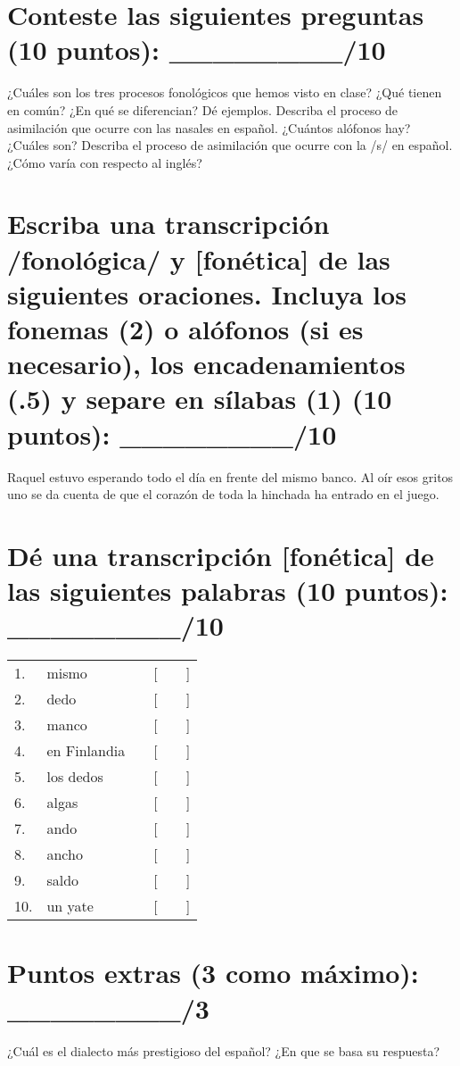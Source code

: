 \documentclass[12pt]{exam}
\begin{document}
\section{Conteste las siguientes preguntas (10 puntos): \_\_\_\_\_\_\_\_/10}
	\begin{questions}
		\question ¿Cuáles son los tres procesos fonológicos que hemos visto en clase? ¿Qué tienen en común? ¿En qué se diferencian? Dé ejemplos.
		\fillwithlines{2in}
		\question Describa el proceso de asimilación que ocurre con las nasales en español. ¿Cuántos alófonos hay? ¿Cuáles son?
		\fillwithlines{2in}
		\question Describa el proceso de asimilación que ocurre con la /s/ en español. ¿Cómo varía con respecto al inglés?
		\fillwithlines{2in}
	\end{questions}


\section{Escriba una transcripción /fonológica/ y [fonética] de las siguientes oraciones. Incluya los fonemas (2) o alófonos (si es necesario), los encadenamientos (.5) y separe en sílabas (1) (10 puntos): \_\_\_\_\_\_\_\_/10 }

	\begin{questions}
		\question Raquel estuvo esperando todo el día en frente del mismo banco. 
		\fillwithlines{.5in}
		\question Al oír esos gritos uno se da cuenta de que el corazón de toda la hinchada ha entrado en el juego. 
		\fillwithlines{.5in}
	\end{questions}

\section{Dé una transcripción [fonética] de las siguientes palabras (10 puntos): \_\_\_\_\_\_\_\_/10 } %

	\renewcommand{\arraystretch}{1.5}
	\begin{tabular}{lllllr}
		1.  & mismo        & & [ &  \phantom{hello world, hello world} & ] \\
		2.  & dedo         & & [ & & ] \\
		3.  & manco        & & [ & & ] \\
		4.  & en Finlandia & & [ & & ] \\
		5.  & los dedos    & & [ & & ] \\
		6.  & algas        & & [ & & ] \\
		7.  & ando         & & [ & & ] \\
		8.  & ancho        & & [ & & ] \\
		9.  & saldo        & & [ & & ] \\
		10. & un yate      & & [ & & ] \\
	\end{tabular}


\section{Puntos extras (3 como máximo): \_\_\_\_\_\_\_\_/3 }
\begin{questions}
	\question ¿Cuál es el dialecto más prestigioso del español? ¿En que se basa su respuesta?
	\fillwithlines{1.5in}
\end{questions}






	
\end{document}
